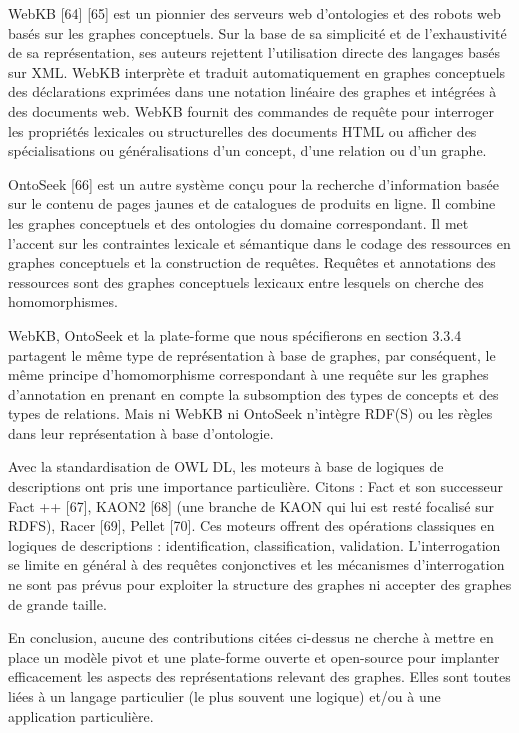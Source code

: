 WebKB [64] [65] est un pionnier des serveurs web d'ontologies et des robots web basés sur les graphes conceptuels. Sur la base de sa simplicité et de l'exhaustivité de sa représentation, ses auteurs rejettent l'utilisation directe des langages basés sur XML. WebKB interprète et traduit automatiquement en graphes conceptuels des déclarations exprimées dans une notation linéaire des graphes et intégrées à des documents web. WebKB fournit des commandes de requête pour interroger les propriétés lexicales ou structurelles des documents HTML ou afficher des spécialisations ou généralisations d'un concept, d'une relation ou d'un graphe.

OntoSeek [66] est un autre système conçu pour la recherche d’information basée sur le contenu de pages jaunes et de catalogues de produits en ligne. Il combine les graphes conceptuels et des ontologies du domaine correspondant. Il met l'accent sur les contraintes lexicale et sémantique dans le codage des ressources en graphes conceptuels et la construction de requêtes. Requêtes et annotations des ressources sont des graphes conceptuels lexicaux entre lesquels on cherche des homomorphismes.

WebKB, OntoSeek et la plate-forme que nous spécifierons en section 3.3.4 partagent le même type de représentation à base de graphes, par conséquent, le même principe d’homomorphisme correspondant à une requête sur les graphes d'annotation en prenant en compte la subsomption des types de concepts et des types de relations. Mais ni WebKB ni OntoSeek n’intègre RDF(S) ou les règles dans leur représentation à base d’ontologie.

Avec la standardisation de OWL DL, les moteurs à base de logiques de descriptions ont pris une importance particulière. Citons : Fact et son successeur Fact ++ [67], KAON2 [68] (une branche de KAON qui lui est resté focalisé sur RDFS), Racer [69], Pellet [70]. Ces moteurs offrent des opérations classiques en logiques de descriptions : identification, classification, validation. L’interrogation se limite en général à des requêtes conjonctives et les mécanismes d’interrogation ne sont pas prévus pour exploiter la structure des graphes ni accepter des graphes de grande taille.

En conclusion, aucune des contributions citées ci-dessus ne cherche à mettre en place un modèle pivot et une plate-forme ouverte et open-source pour implanter efficacement les aspects des représentations relevant des graphes. Elles sont toutes liées à un langage particulier (le plus souvent une logique) et/ou à une application particulière.

